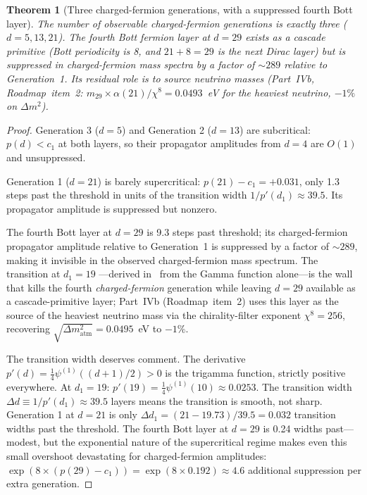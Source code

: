 \documentclass[12pt,a4paper]{article}
\newtheorem{theorem}{Theorem}[section]
\begin{document}
\begin{theorem}[Three charged-fermion generations, with a suppressed fourth Bott layer]\label{thm:generations}
The number of observable charged-fermion generations is exactly three
($d=5,13,21$). The fourth Bott fermion layer at $d=29$ exists as a
cascade primitive (Bott periodicity is 8, and $21+8=29$ is the next
Dirac layer) but is suppressed in charged-fermion mass spectra by a
factor of $\sim 289$ relative to Generation~1. Its residual role is
to source neutrino masses (Part~IVb, Roadmap~item~2: $m_{29}\times
\alpha(21)/\chi^8 = 0.0493$~eV for the heaviest neutrino, $-1\%$ on
$\Delta m^2$).
\end{theorem}
\begin{proof}
Generation 3 ($d=5$) and Generation 2 ($d=13$) are subcritical:
$p(d)<c_1$ at both layers, so their propagator amplitudes from $d=4$
are $O(1)$ and unsuppressed.

Generation 1 ($d=21$) is barely supercritical: $p(21)-c_1=+0.031$,
only 1.3 steps past the threshold in units of the transition width
$1/p'(d_1)\approx 39.5$. Its propagator amplitude is suppressed but
nonzero.

The fourth Bott layer at $d=29$ is 9.3 steps past threshold; its
charged-fermion propagator amplitude relative to Generation~1 is
suppressed by a factor of $\sim 289$, making it invisible in the
observed charged-fermion mass spectrum. The transition at $d_1=19$
---derived in~\cite{part0} from the Gamma function alone---is the
wall that kills the fourth \emph{charged-fermion} generation while
leaving $d=29$ available as a cascade-primitive layer; Part~IVb
(Roadmap~item~2) uses this layer as the source of the heaviest
neutrino mass via the chirality-filter exponent $\chi^8=256$,
recovering $\sqrt{\Delta m^2_{\mathrm{atm}}} = 0.0495$~eV to $-1\%$.

The transition width deserves comment. The derivative
$p'(d)=\tfrac{1}{4}\psi^{(1)}((d+1)/2)>0$ is the trigamma function,
strictly positive everywhere. At $d_1=19$:
$p'(19)=\tfrac{1}{4}\psi^{(1)}(10)\approx 0.0253$. The transition
width $\Delta d\equiv 1/p'(d_1)\approx 39.5$ layers means the
transition is smooth, not sharp. Generation 1 at $d=21$ is only
$\Delta d_1=(21-19.73)/39.5=0.032$ transition widths past the
threshold. The fourth Bott layer at $d=29$ is 0.24 widths
past---modest, but the exponential nature of the supercritical
regime makes even this small overshoot devastating for
charged-fermion amplitudes:
$\exp(8\times(p(29)-c_1))=\exp(8\times 0.192)\approx 4.6$ additional
suppression per extra generation.
\end{proof}
\end{document}
